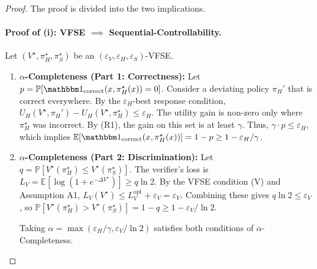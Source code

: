 \begin{proof}
The proof is divided into the two implications.

\paragraph{Proof of (i): VFSE $\implies$ Sequential-Controllability.}
Let $(V^\star, \pi_H^\star, \pi_S^\star)$ be an $(\varepsilon_V, \varepsilon_H, \varepsilon_S)$-VFSE.

\begin{enumerate}
\item  \textbf{$\alpha$-Completeness (Part 1: Correctness):} Let $p = \mathbb{P}[\corr(x, \pi_H^\star(x)) = 0]$. Consider a deviating policy $\pi_H'$ that is correct everywhere. By the $\varepsilon_H$-best response condition, $U_H(V^\star, \pi_H') - U_H(V^\star, \pi_H^\star) \le \varepsilon_H$. The utility gain is non-zero only where $\pi_H^\star$ was incorrect. By (R1), the gain on this set is at least $\gamma$. Thus, $\gamma \cdot p \le \varepsilon_H$, which implies $\mathbb{E}[\corr(x, \pi_H^\star(x))] = 1-p \ge 1 - \varepsilon_H/\gamma$.

\item  \textbf{$\alpha$-Completeness (Part 2: Discrimination):} Let $q = \mathbb{P}[V^\star(\pi_H^\star) \le V^\star(\pi_S^\star)]$. The verifier's loss is $L_V = \mathbb{E}[\log(1+e^{-\Delta V^\star})] \ge q \ln 2$. By the VFSE condition (V) and Assumption A1, $L_V(V^\star) \le L_V^\mathrm{opt} + \varepsilon_V = \varepsilon_V$. Combining these gives $q \ln 2 \le \varepsilon_V$, so $\mathbb{P}[V^\star(\pi_H^\star) > V^\star(\pi_S^\star)] = 1-q \ge 1 - \varepsilon_V/\ln 2$.

    Taking $\alpha = \max(\varepsilon_H/\gamma, \varepsilon_V/\ln 2)$ satisfies both conditions of $\alpha$-Completeness.


\end{enumerate}
\end{proof}
